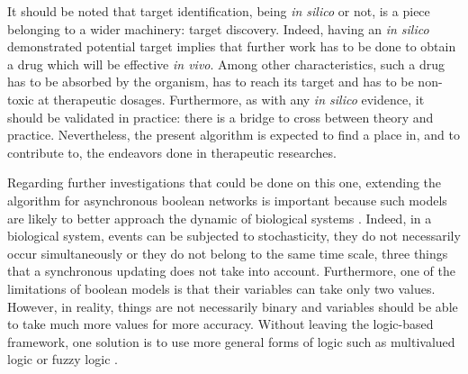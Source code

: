 \documentclass[oneside,a4paper,onecolumn,notitlepage]{article}
\begin{document}
It should be noted that target identification, being \textit{in silico} or not, is a piece belonging to a wider machinery: target discovery. Indeed, having an \textit{in silico} demonstrated potential target implies that further work has to be done to obtain a drug which will be effective \textit{in vivo}. Among other characteristics, such a drug has to be absorbed by the organism, has to reach its target and has to be non-toxic at therapeutic dosages. Furthermore, as with any \textit{in silico} evidence, it should be validated in practice: there is a bridge to cross between theory and practice. Nevertheless, the present algorithm is expected to find a place in, and to contribute to, the endeavors done in therapeutic researches.

Regarding further investigations that could be done on this one, extending the algorithm for asynchronous boolean networks is important because such models are likely to better approach the dynamic of biological systems \cite{saadatpour2010attractor}. Indeed, in a biological system, events can be subjected to stochasticity, they do not necessarily occur simultaneously or they do not belong to the same time scale, three things that a synchronous updating does not take into account. Furthermore, one of the limitations of boolean models is that their variables can take only two values. However, in reality, things are not necessarily binary and variables should be able to take much more values for more accuracy. Without leaving the logic-based framework, one solution is to use more general forms of logic such as multivalued logic or fuzzy logic \cite{zadeh1988fuzzy}.



\end{document}
